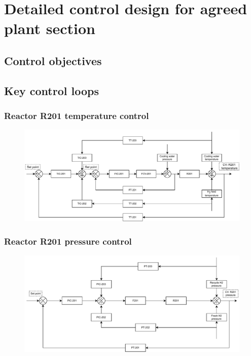 \section{Detailed control design for agreed plant section}
\label{sec:subsec}

\subsection{Control objectives}

\subsection{Key control loops}

\subsubsection{Reactor R201 temperature control}
\begin{figure}[H]
    \centering
    \includegraphics[width=\linewidth]{chapters/4-operation-control/4-Figures/R201-TC.pdf}
    \caption{}
    \label{fig:R201-TC}
\end{figure}

\subsubsection{Reactor R201 pressure control}
\begin{figure}[H]
    \centering
    \includegraphics[width=\linewidth]{chapters/4-operation-control/4-Figures/R201-PC.pdf}
    \caption{}
    \label{fig:R201-PC}
\end{figure}

